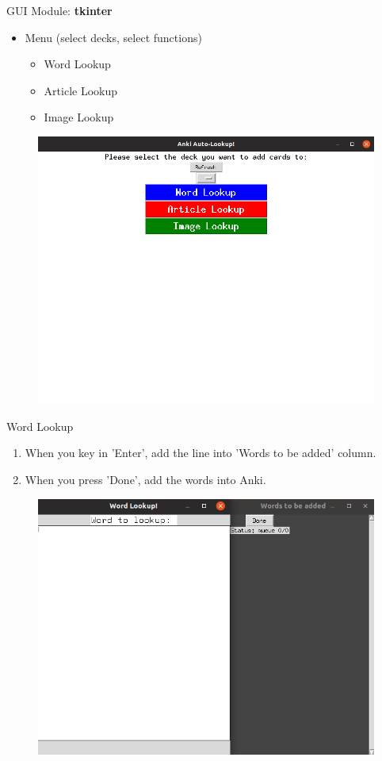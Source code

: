 \documentclass{beamer}
\begin{document}
\begin{frame}{GUI}
		Module: \textbf{tkinter}\\
		\begin{itemize}
			\item Menu (select decks, select functions)\\
			\begin{itemize}
				\item Word Lookup\\
				\item Article Lookup\\
				\item Image Lookup\\
			\end{itemize}
		\end{itemize}
		\begin{figure}[h]
				\centering
				\includegraphics[width=0.6\linewidth]{./GUI_main.png}
		\end{figure}
\end{frame}

\begin{frame}{Word Lookup}
	\begin{enumerate}
		\item When you key in 'Enter', add the line into 'Words to be added' column.
		\item When you press 'Done', add the words into Anki.
	\end{enumerate}
	\begin{figure}[h]
			\centering
			\includegraphics[width=0.6\linewidth]{./word_lookup_gui.png}
	\end{figure}
\end{frame}
\end{document}
